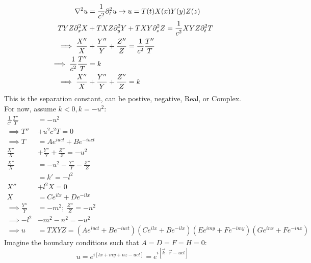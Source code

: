 \documentclass[Maths.tex]{subfiles}
\begin{document}
\begin{example}
\begin{align}
	\nabla^2u &= \frac{1}{c^2}\partial_t^2u \to u = T(t)X(x)Y(y)Z(z) \\
	TYZ\partial_x^2X &+ TXZ\partial_y^2Y + TXY\partial_z^2Z = \frac{1}{c^2}XYZ\partial_t^2T \\
	\implies \frac{X''}{X} &+ \frac{Y''}{Y} + \frac{Z''}{Z} = \frac{1}{c^2}\frac{T''}{T} \\
	\implies \frac{1}{c^2}\frac{T''}{T} &= k \\
	\implies \frac{X''}{X} &+ \frac{Y''}{Y} + \frac{Z''}{Z} = k
\end{align}
This is the separation constant, can be postive, negative, Real, or Complex. \\
For now, assume $k < 0, k = -u^2$:
\begin{align}
	\frac{1}{c^2}\frac{T''}{T} &= -u^2 \\
	\implies T'' &+ u^2c^2T = 0 \\
	\implies T &= Ae^{iuct} + Be^{-iuct} \\
	\frac{X''}{X} &+ \frac{Y''}{Y} + \frac{Z''}{Z} = -u^2 \\
	\frac{X''}{X} &= -u^2 - \frac{Y''}{Y} - \frac{Z''}{Z} \\
				  &= k' = -l^2 \\
	X'' &+ l^2X = 0 \\
	X &= Ce^{ilx} + De^{-ilx} \\
	\implies \frac{Y''}{Y} &= -m^2;~ \frac{Z''}{Z} = -n^2 \\
	\implies -l^2 &- m^2 - n^2 = -u^2 \\
	\implies u &= TXYZ = \left(Ae^{iuct} + Be^{-iuct}\right)\left(Ce^{ilx} + Be^{-ilx}\right)\left(Ee^{imy} + Fe^{-imy}\right) \left(Ge^{inx} + Fe^{-inx}\right)
\end{align}
Imagine the boundary conditions such that $A = D = F = H = 0$:
\begin{equation}
	u = e^{i[lx + my + nz - uct]} = e^{i[\vec{k}\cdot\vec{r} - uct]}
\end{equation}
\end{example}
\end{document}

